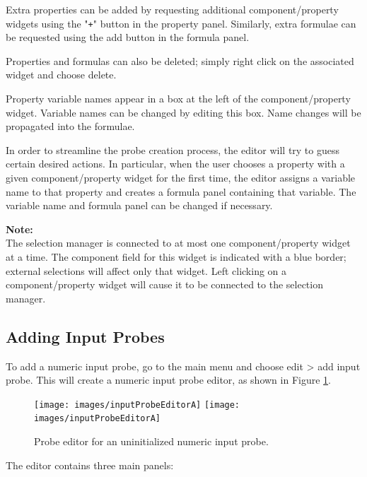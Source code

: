 \documentclass{article}
\begin{document}
Extra properties can be added by requesting additional
component/property widgets using the "{\tt +}" button
in the property panel. Similarly,
extra formulae can be requested using
the add button in the formula panel.

Properties and formulas can also be deleted; simply right
click on the associated widget and choose {\sf delete}.

Property variable names appear in a box at the left of the
component/property widget. Variable names can be changed by editing
this box. Name changes will be propagated into the formulae.

In order to streamline the probe creation process, the editor will try
to guess certain desired actions.  In particular, when the user
chooses a property with a given component/property widget for the
first time, the editor assigns a variable name to that property and
creates a formula panel containing that variable. The variable name
and formula panel can be changed if necessary.

\begin{sideblock}
{\bf Note:}\\ 
The selection manager is connected to at most one
component/property widget at a time. The component field for this
widget is indicated with a blue border; external selections will
affect only that widget. Left clicking on a component/property widget
will cause it to be connected to the selection manager.
\end{sideblock}

\subsection{Adding Input Probes}

To add a numeric input probe, go to the main
menu and choose {\sf edit > add input probe}. This will create
a numeric input probe editor, as shown in Figure \ref{InputProbeEditorAFig}.

\begin{figure}
\begin{center}
\iflatexml
\texttt{[image: images/inputProbeEditorA]}
\else
\texttt{[image: images/inputProbeEditorA]}
\fi
\end{center}
\caption{Probe editor for an uninitialized numeric input probe.}%
\label{InputProbeEditorAFig}
\end{figure}

The editor contains three main panels:
\end{document}
